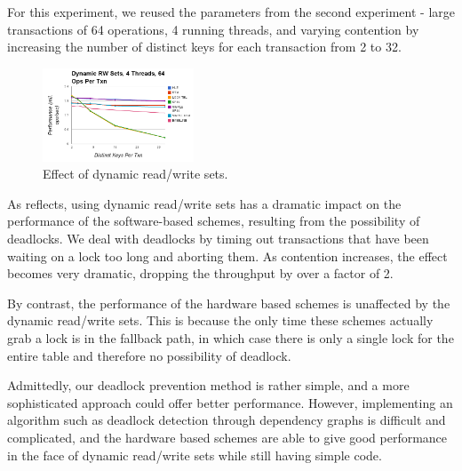 For this experiment, we reused the parameters from the second experiment - 
large transactions of 64 operations, 4 running threads, and varying 
contention by increasing the number of distinct keys for each transaction 
from 2 to 32.

\begin{figure}[h!]
  \centering
  \includegraphics[width=0.4\textwidth]{figure/dynamic.png}
  \caption{Effect of dynamic read/write sets.}
  \label{fig:dynamic} 
\end{figure}

As  reflects, using dynamic read/write sets has a dramatic 
impact on the performance of the software-based schemes, resulting from the 
possibility of deadlocks. We deal with deadlocks by timing out transactions 
that have been waiting on a lock too long and aborting them. As contention 
increases, the effect becomes very dramatic, dropping the throughput by over 
a factor of 2.

By contrast, the performance of the hardware based schemes is unaffected by 
the dynamic read/write sets. This is because the only time these schemes 
actually grab a lock is in the fallback path, in which case there is only a 
single lock for the entire table and therefore no possibility of deadlock.

Admittedly, our deadlock prevention method is rather simple, and a more 
sophisticated approach could offer better performance. However, implementing 
an algorithm such as deadlock detection through dependency graphs is difficult 
and complicated, and the hardware based schemes are able to give good 
performance in the face of dynamic read/write sets while still having 
simple code.


